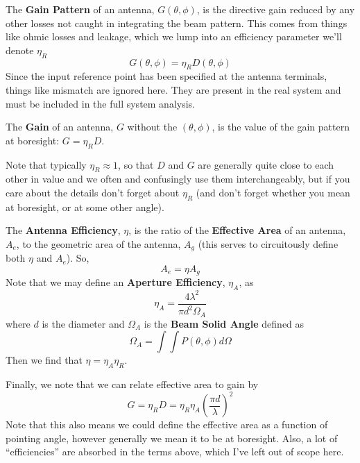 \documentclass[11pt]{article}
\begin{document}
The {\bf Gain Pattern} of an antenna, $G(\theta,\phi)$, is the directive gain reduced by any other losses not caught in integrating the beam pattern.  This comes from things like ohmic losses and leakage, which we lump into an efficiency parameter we'll denote $\eta_R$
\begin{equation}
G(\theta,\phi) = \eta_R D(\theta,\phi)
\end{equation}
Since the input reference point has been specified at the antenna terminals, things like mismatch are ignored here.  They are present in the real system and must be included in the full system analysis.

The {\bf Gain} of an antenna, $G$ without the $(\theta,\phi)$, is the value of the gain pattern at boresight:  $G = \eta_R D$.

Note that typically $\eta_R \approx 1$, so that $D$ and $G$ are generally quite close to each other in value and we often and confusingly use them interchangeably, but if you care about the details don't forget about $\eta_R$ (and don't forget whether you mean at boresight, or at some other angle).

The {\bf Antenna Efficiency}, $\eta$, is the ratio of the  {\bf Effective Area} of an antenna, $A_e$, to the geometric area of the antenna, $A_g$ (this serves to circuitously define both $\eta$ and $A_e$).  So,
\begin{equation}
A_e = \eta A_g
\end{equation}
Note that we may define an {\bf Aperture Efficiency}, $\eta_A$, as
\begin{equation}
\eta_A = \frac{4\lambda^2}{\pi d^2\Omega_A}
\end{equation}
where $d$ is the diameter and $\Omega_A$ is the {\bf Beam Solid Angle} defined as
\begin{equation}
\Omega_A = \int \int P(\theta,\phi)d\Omega
\end{equation}
Then we find that $\eta = \eta_A \eta_R$.

Finally, we note that we can relate effective area to gain by
\begin{equation}
G = \eta_R D = \eta_R \eta_A\left(\frac{\pi d}{\lambda}\right)^2
\end{equation}
Note that this also means we could define the effective area as a function of pointing angle, however generally we mean it to be at boresight.  Also, a lot of ``efficiencies'' are absorbed in the terms above, which I've left out of scope here.
\end{document}

